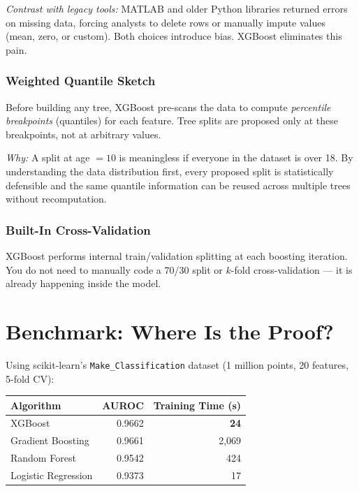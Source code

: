 \documentclass[11pt]{article}
\begin{document}
\textit{Contrast with legacy tools:} MATLAB and older Python libraries returned
errors on missing data, forcing analysts to delete rows or manually impute values
(mean, zero, or custom). Both choices introduce bias. XGBoost eliminates this pain.

\subsubsection{Weighted Quantile Sketch}
Before building any tree, XGBoost pre-scans the data to compute \emph{percentile
breakpoints} (quantiles) for each feature. Tree splits are proposed only at these
breakpoints, not at arbitrary values.

\textit{Why:} A split at age $= 10$ is meaningless if everyone in the dataset is
over 18. By understanding the data distribution first, every proposed split is
statistically defensible and the same quantile information can be reused across
multiple trees without recomputation.

\subsubsection{Built-In Cross-Validation}
XGBoost performs internal train/validation splitting at each boosting iteration.
You do not need to manually code a 70/30 split or $k$-fold cross-validation ---
it is already happening inside the model.

\newpage
\section{Benchmark: Where Is the Proof?}

Using scikit-learn's \texttt{Make\_Classification} dataset (1 million points, 20
features, 5-fold CV):

\begin{center}
\begin{tabular}{@{}lrr@{}}
\toprule
\textbf{Algorithm}   & \textbf{AUROC} & \textbf{Training Time (s)} \\
\midrule
XGBoost              & 0.9662         & \textbf{24}               \\
Gradient Boosting    & 0.9661         & 2{,}069                   \\
Random Forest        & 0.9542         & 424                       \\
Logistic Regression  & 0.9373         & 17                        \\
\bottomrule
\end{tabular}
\end{center}
\end{document}
